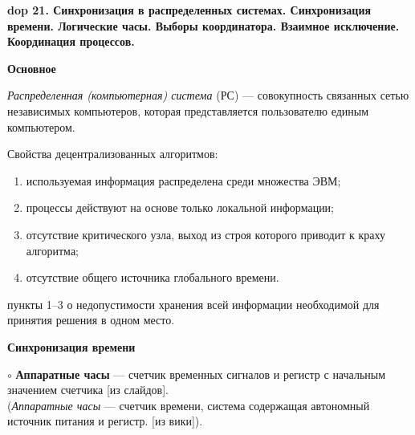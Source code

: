 \newcommand{\notsure}[1]{(видимо: #1)}
\newcommand{\aboba}[2]{\textbf{\LARGE dop #1. #2}}
\newcommand{\multicom}[1]{}
\newcommand{\lulz}[1]{}
\newcommand{\wantsayInstead}[1]{}

\textbf{\LARGE dop 21. Синхронизация  в  распределенных  системах.  Синхронизация  времени.  Логические  часы.  Выборы координатора. Взаимное исключение. Координация процессов.}

\bigbreak

\centerline{\textbf{Основное}}

\textit{Распределенная (компьютерная) система} (РС) --– совокупность связанных
сетью независимых компьютеров, которая представляется
пользователю единым компьютером. 


Свойства децентрализованных алгоритмов:
\vspace{-0.7em}
\begin{enumerate}
\setlength\itemsep{-0.4em}
\item используемая информация распределена среди множества ЭВМ;
\item процессы действуют на основе только локальной информации;
\item отсутствие критического узла, выход из строя которого приводит к краху алгоритма;
\item отсутствие общего источника глобального времени.
\end{enumerate}
пункты 1--3 о недопустимости хранения всей информации необходимой для принятия решения в одном место.


\centerline{\textbf{Синхронизация времени}}

$\circ$
\textbf{Аппаратные часы} --- счетчик временных сигналов и регистр с начальным значением счетчика [из слайдов].
\\
(\textit{Аппаратные часы} --- счетчик времени, система содержащая автономный источник питания и регистр. [из вики]).

